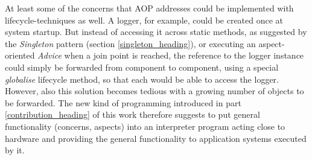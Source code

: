 At least some of the concerns that AOP addresses could be implemented with
lifecycle-techniques as well. A logger, for example, could be created once at
system startup. But instead of accessing it across static methods, as suggested
by the \emph{Singleton} pattern (section \ref{singleton_heading}), or executing
an aspect-oriented \emph{Advice} when a join point is reached, the reference to
the logger instance could simply be forwarded from component to component,
using a special \emph{globalise} lifecycle method, so that each would be able
to access the logger. However, also this solution becomes tedious with a
growing number of objects to be forwarded. The new kind of programming
introduced in part \ref{contribution_heading} of this work therefore suggests
to put general functionality (concerns, aspects) into an interpreter program
acting close to hardware and providing the general functionality to application
systems executed by it.
